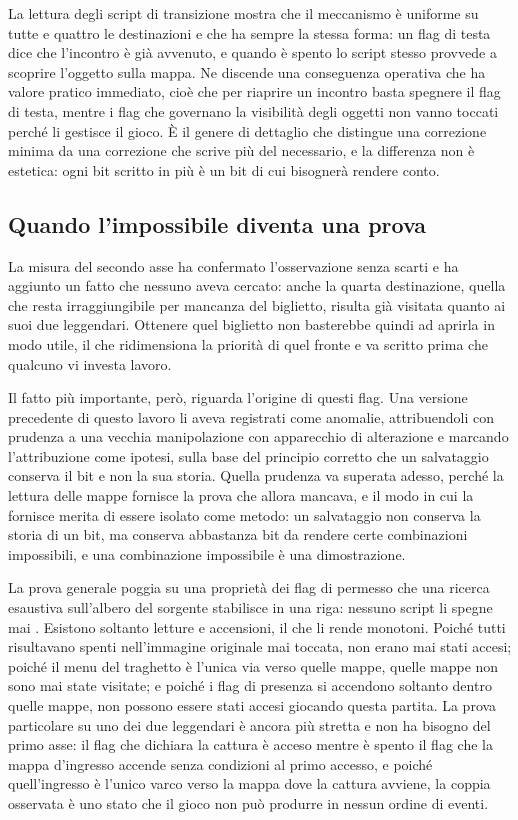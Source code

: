 La lettura degli script di transizione mostra che il meccanismo è uniforme su tutte e quattro le destinazioni e che ha sempre la stessa forma: un flag di testa dice che l'incontro è già avvenuto, e quando è spento lo script stesso provvede a scoprire l'oggetto sulla mappa. Ne discende una conseguenza operativa che ha valore pratico immediato, cioè che per riaprire un incontro basta spegnere il flag di testa, mentre i flag che governano la visibilità degli oggetti non vanno toccati perché li gestisce il gioco. È il genere di dettaglio che distingue una correzione minima da una correzione che scrive più del necessario, e la differenza non è estetica: ogni bit scritto in più è un bit di cui bisognerà rendere conto.

\subsection{Quando l'impossibile diventa una prova}

La misura del secondo asse ha confermato l'osservazione senza scarti e ha aggiunto un fatto che nessuno aveva cercato: anche la quarta destinazione, quella che resta irraggiungibile per mancanza del biglietto, risulta già visitata quanto ai suoi due leggendari. Ottenere quel biglietto non basterebbe quindi ad aprirla in modo utile, il che ridimensiona la priorità di quel fronte e va scritto prima che qualcuno vi investa lavoro.

Il fatto più importante, però, riguarda l'origine di questi flag. Una versione precedente di questo lavoro li aveva registrati come anomalie, attribuendoli con prudenza a una vecchia manipolazione con apparecchio di alterazione e marcando l'attribuzione come ipotesi, sulla base del principio corretto che un salvataggio conserva il bit e non la sua storia. Quella prudenza va superata adesso, perché la lettura delle mappe fornisce la prova che allora mancava, e il modo in cui la fornisce merita di essere isolato come metodo: un salvataggio non conserva la storia di un bit, ma conserva abbastanza bit da rendere certe combinazioni impossibili, e una combinazione impossibile è una dimostrazione.

La prova generale poggia su una proprietà dei flag di permesso che una ricerca esaustiva sull'albero del sorgente stabilisce in una riga: nessuno script li spegne mai \cite{pokeemerald}. Esistono soltanto letture e accensioni, il che li rende monotoni. Poiché tutti risultavano spenti nell'immagine originale mai toccata, non erano mai stati accesi; poiché il menu del traghetto è l'unica via verso quelle mappe, quelle mappe non sono mai state visitate; e poiché i flag di presenza si accendono soltanto dentro quelle mappe, non possono essere stati accesi giocando questa partita. La prova particolare su uno dei due leggendari è ancora più stretta e non ha bisogno del primo asse: il flag che dichiara la cattura è acceso mentre è spento il flag che la mappa d'ingresso accende senza condizioni al primo accesso, e poiché quell'ingresso è l'unico varco verso la mappa dove la cattura avviene, la coppia osservata è uno stato che il gioco non può produrre in nessun ordine di eventi.

